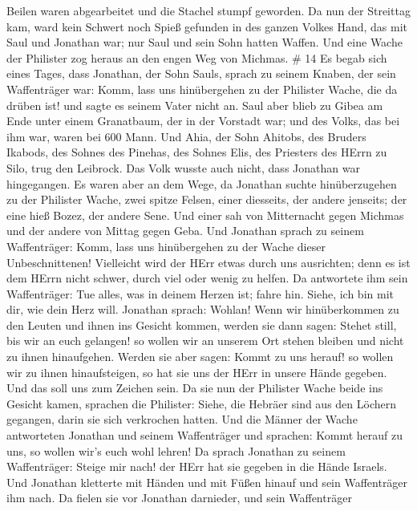 Beilen waren abgearbeitet und die Stachel stumpf geworden. 
Da nun der Streittag kam, ward kein Schwert noch Spieß gefunden in des
ganzen Volkes Hand, das mit Saul und Jonathan war; nur Saul und sein
Sohn hatten Waffen.  Und eine Wache der Philister zog
heraus an den engen Weg von Michmas. \# 14  Es begab sich
eines Tages, dass Jonathan, der Sohn Sauls, sprach zu seinem Knaben, der
sein Waffenträger war: Komm, lass uns hinübergehen zu der Philister
Wache, die da drüben ist! und sagte es seinem Vater nicht an.
 Saul aber blieb zu Gibea am Ende unter einem Granatbaum,
der in der Vorstadt war; und des Volks, das bei ihm war, waren bei 600
Mann.  Und Ahia, der Sohn Ahitobs, des Bruders Ikabods, des
Sohnes des Pinehas, des Sohnes Elis, des Priesters des HErrn zu Silo,
trug den Leibrock. Das Volk wusste auch nicht, dass Jonathan war
hingegangen.  Es waren aber an dem Wege, da Jonathan suchte
hinüberzugehen zu der Philister Wache, zwei spitze Felsen, einer
diesseits, der andere jenseits; der eine hieß Bozez, der andere Sene.
 Und einer sah von Mitternacht gegen Michmas und der andere
von Mittag gegen Geba.  Und Jonathan sprach zu seinem
Waffenträger: Komm, lass uns hinübergehen zu der Wache dieser
Unbeschnittenen! Vielleicht wird der HErr etwas durch uns ausrichten;
denn es ist dem HErrn nicht schwer, durch viel oder wenig zu helfen.
 Da antwortete ihm sein Waffenträger: Tue alles, was in
deinem Herzen ist; fahre hin. Siehe, ich bin mit dir, wie dein Herz
will.  Jonathan sprach: Wohlan! Wenn wir hinüberkommen zu
den Leuten und ihnen ins Gesicht kommen,  werden sie dann
sagen: Stehet still, bis wir an euch gelangen! so wollen wir an unserem
Ort stehen bleiben und nicht zu ihnen hinaufgehen.  Werden
sie aber sagen: Kommt zu uns herauf! so wollen wir zu ihnen
hinaufsteigen, so hat sie uns der HErr in unsere Hände gegeben. Und das
soll uns zum Zeichen sein.  Da sie nun der Philister Wache
beide ins Gesicht kamen, sprachen die Philister: Siehe, die Hebräer sind
aus den Löchern gegangen, darin sie sich verkrochen hatten.
 Und die Männer der Wache antworteten Jonathan und seinem
Waffenträger und sprachen: Kommt herauf zu uns, so wollen wir's euch
wohl lehren! Da sprach Jonathan zu seinem Waffenträger: Steige mir nach!
der HErr hat sie gegeben in die Hände Israels.  Und
Jonathan kletterte mit Händen und mit Füßen hinauf und sein Waffenträger
ihm nach. Da fielen sie vor Jonathan darnieder, und sein Waffenträger
